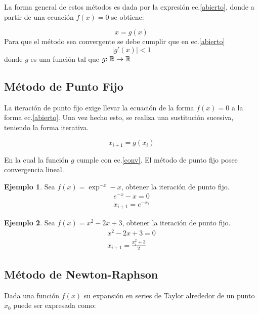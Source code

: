 \documentclass[letterpaper,10pt,oneside]{sphinxmanual}
\theoremstyle{plain}%
\theoremstyle{definition}%
\newtheorem{ejemplo}{Ejemplo}[chapter]
\theoremstyle{remark}%
\newcommand{\modulo}[1]{\left | #1 \right |}
\newcommand{\f}[3]{#1 \negthickspace : #2 \to #3}
\begin{document}
\noindent La forma general de estos métodos es dada por la expresión ec.\ref{abierto}, donde a partir de una ecuación $f(x)=0$ se obtiene:\medskip

\begin{equation}
 x=g(x) \label{abierto} 
\end{equation}
Para que el método sea convergente se debe cumplir que en ec.\ref{abierto} 
\begin{equation}
 \modulo{g\prime(x)}<1 \label{conv}
\end{equation}
donde $g$ es una función tal que $\f{g}{\mathbb{R}}{\mathbb{R}}$

\subsection{Método de Punto Fijo}

\noindent La iteración de punto fijo exige llevar la ecuación de la forma $f(x)=0$ a la forma ec.\ref{abierto}. Una vez hecho esto, se realiza una sustitución sucesiva, teniendo la forma iterativa.\medskip

\begin{equation}
 x_{i+1}=g(x_{i}) \label{fijo}
\end{equation}

\noindent En la cual la función $g$ cumple con ec.\ref{conv}. El método de punto fijo posee convergencia lineal.\medskip

\begin{ejemplo}
\noindent Sea $f(x)=\exp^{-x}-x$, obtener la iteración de punto fijo.
\begin{eqnarray*}
 e^{-x}-x=0 \\
x_{i+1}=e^{-x_{i}}
\end{eqnarray*}
\end{ejemplo}
\begin{ejemplo}
\noindent Sea $f(x)=x^{2}-2x+3$, obtener la iteración de punto fijo.
\begin{eqnarray*}
x^{2}-2x+3=0 \\
x_{i+1}=\frac{x_{i}^{2}+3}{2}
\end{eqnarray*}
\end{ejemplo}

\subsection{Método de Newton-Raphson}

\medskip Dada una función $f(x)$ su expansión en series de Taylor alrededor de un punto $x_{0}$ puede ser expresada como:\medskip
\end{document}
